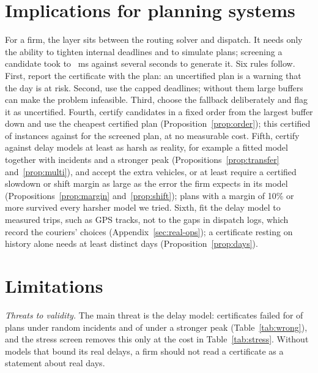 \documentclass[11pt,a4paper]{article}
\theoremstyle{remark}
\begin{document}
\section{Implications for planning systems}\label{sec:implications}

For a firm, the layer sits between the routing solver and dispatch. It needs only the
ability to tighten internal deadlines and to simulate plans; screening a candidate
took \TimeScreenTwenty{} to \TimeScreenTwoHundred{}~ms against several seconds to
generate it. Six rules follow. First, report the certificate with the plan: an
uncertified plan is a warning that the day is at risk. Second, use the capped
deadlines; without them large buffers can make the problem infeasible. Third, choose
the fallback deliberately and flag it as uncertified. Fourth, certify candidates in a fixed order from the largest buffer
down and use the cheapest certified plan (Proposition~\ref{prop:order}); this certified
\FoFixed{} of \FoInst{} instances against \FoProc{} for the screened plan, at no
measurable cost. Fifth, certify against delay models at least as harsh as reality,
for example a fitted model together with incidents and a stronger peak
(Propositions~\ref{prop:transfer} and~\ref{prop:multi}), and accept the extra vehicles,
or at least require a certified slowdown or shift margin as large as the error the firm
expects in its model (Propositions~\ref{prop:margin} and~\ref{prop:shift}); plans with a margin of 10\% or more
survived every harsher model we tried.
Sixth, fit the delay model to measured trips, such as GPS tracks, not to the gaps in
dispatch logs, which record the couriers' choices (Appendix~\ref{sec:real-ops}); a
certificate resting on history alone needs at least \LfDaysZero{} distinct days
(Proposition~\ref{prop:days}).

\section{Limitations}\label{sec:limitations}

\emph{Threats to validity.} The main threat is the delay model: certificates failed
for \WrIncFailed{} of \WrIncCert{} plans under random incidents and \WrPeakFailed{} of
\WrIncCert{} under a stronger peak (Table~\ref{tab:wrong}), and the stress screen removes
this only at the cost in Table~\ref{tab:stress}. Without models that bound its real
delays, a firm should not read a certificate as a statement about real days.
\end{document}
